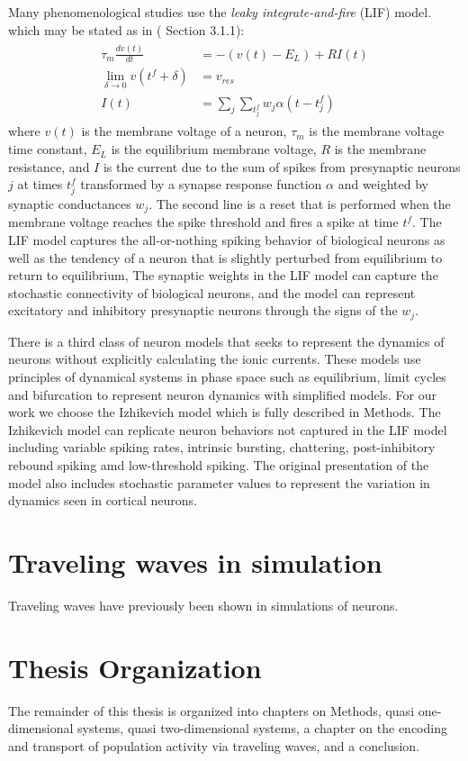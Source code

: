 Many phenomenological studies use the \textit{leaky integrate-and-fire} (LIF) model\citep{Abbott1999}. which may be stated as in (\citet{Trappenberg2010} Section 3.1.1):
\begin{align}
  \begin{split}
    \tau_m \frac{dv(t)}{dt} &= -(v(t)-E_L) + RI(t) \\
    \displaystyle\lim_{\delta \rightarrow 0} v(t^f + \delta) &= v_{res}\\ 
    I(t) &= \sum_j \sum_{t^f_j}w_j\alpha(t-t^f_j)
  \end{split}
\end{align}
where $v(t)$ is the membrane voltage of a neuron, $\tau_m$ is the membrane voltage time constant, $E_L$ is the equilibrium membrane voltage, $R$ is the membrane resistance, and
$I$ is the current due to the sum of spikes from presynaptic neurons $j$ at times $t^f_j$ transformed by a synapse response function $\alpha$ and weighted by synaptic conductances $w_j$.
The second line is a reset that is performed when the membrane voltage reaches the spike threshold and fires a spike at time $t^f$.
The LIF model captures the all-or-nothing spiking behavior of biological neurons as well as the tendency of a neuron that is slightly perturbed from equilibrium to return to equilibrium,
The synaptic weights in the LIF model can capture the stochastic connectivity of biological neurons, and the model can represent excitatory and inhibitory presynaptic neurons through the signs of the $w_j$.

There is a third class of neuron models that seeks to represent the dynamics of neurons without explicitly calculating the ionic currents.
These models use principles of dynamical systems in phase space such as equilibrium, limit cycles and bifurcation to represent neuron dynamics with simplified models.
For our work we choose the Izhikevich model\citep{izhikevich2003} which is fully described in Methods.
The Izhikevich model can replicate neuron behaviors not captured in the LIF model including variable spiking rates, intrinsic bursting, chattering, post-inhibitory rebound spiking amd low-threshold spiking.
The original presentation of the model also includes stochastic parameter values to represent the variation in dynamics seen in cortical neurons.

\section{Traveling waves in simulation}
Traveling waves have previously been shown in simulations of neurons.


\section{Thesis Organization}
The remainder of this thesis is organized into chapters on Methods, quasi one-dimensional systems, quasi two-dimensional systems, a chapter on the encoding and transport of population activity via traveling waves, and a conclusion.

\endinput
